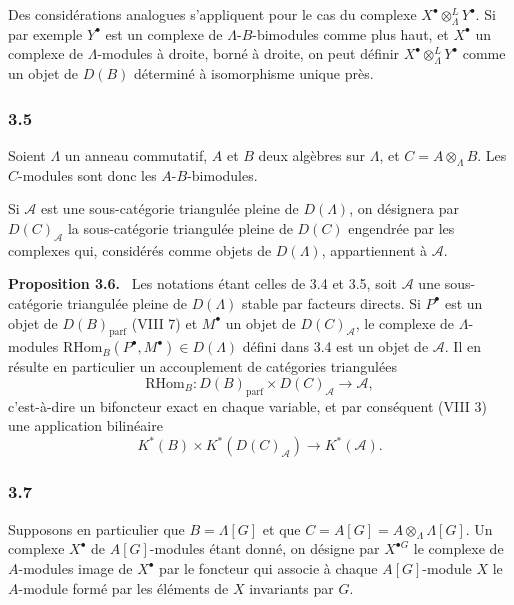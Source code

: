 \documentclass[11pt]{article}
\newenvironment{statement}[1]{\par\medskip\noindent\textbf{#1.}\ }{\par\medskip}
\providecommand{\RHom}{\mathrm{RHom}}
\providecommand{\parf}{\mathrm{parf}}
\providecommand{\RHom}{\mathrm{RHom}}
\providecommand{\RHom}{\mathrm R\mathcal{H}om}
\providecommand{\parf}{\mathrm{parf}}
\providecommand{\RHom}{\mathrm{RHom}}
\begin{document}
Des considérations analogues s'appliquent pour le cas du complexe $X^\bullet\otimes_\Lambda^L Y^\bullet$. Si par exemple $Y^\bullet$ est un complexe de $\Lambda$-$B$-bimodules comme plus haut, et $X^\bullet$ un complexe de $\Lambda$-modules à droite, borné à droite, on peut définir $X^\bullet\otimes_\Lambda^L Y^\bullet$ comme un objet de $D(B)$ déterminé à isomorphisme unique près.

\subsubsection*{3.5}

Soient $\Lambda$ un anneau commutatif, $A$ et $B$ deux algèbres sur $\Lambda$, et $C=A\otimes_{\Lambda}B$. Les $C$-modules sont donc les $A$-$B$-bimodules.

Si $\mathcal A$ est une sous-catégorie triangulée pleine de $D(\Lambda)$, on désignera par $D(C)_{\mathcal A}$ la sous-catégorie triangulée pleine de $D(C)$ engendrée par les complexes qui, considérés comme objets de $D(\Lambda)$, appartiennent à $\mathcal A$.

\begin{statement}{Proposition 3.6}
Les notations étant celles de 3.4 et 3.5, soit $\mathcal A$ une sous-catégorie triangulée pleine de $D(\Lambda)$ stable par facteurs directs. Si $P^\bullet$ est un objet de $D(B)_{\parf}$ (VIII 7) et $M^\bullet$ un objet de $D(C)_{\mathcal A}$, le complexe de $\Lambda$-modules $\RHom_B(P^\bullet,M^\bullet)\in D(\Lambda)$ défini dans 3.4 est un objet de $\mathcal A$. Il en résulte en particulier un accouplement de catégories triangulées
\[
\RHom_B:D(B)_{\parf}\times D(C)_{\mathcal A}\longrightarrow \mathcal A,
\tag{3.6.1}
\]
c'est-à-dire un bifoncteur exact en chaque variable, et par conséquent (VIII 3) une application bilinéaire
\[
K^*(B)\times K^*(D(C)_{\mathcal A})\longrightarrow K^*(\mathcal A).
\tag{3.6.2}
\]
\end{statement}

\subsubsection*{3.7}

Supposons en particulier que $B=\Lambda[G]$ et que $C=A[G]=A\otimes_\Lambda\Lambda[G]$. Un complexe $X^\bullet$ de $A[G]$-modules étant donné, on désigne par $X^{\bullet G}$ le complexe de $A$-modules image de $X^\bullet$ par le foncteur qui associe à chaque $A[G]$-module $X$ le $A$-module formé par les éléments de $X$ invariants par $G$.
\end{document}
